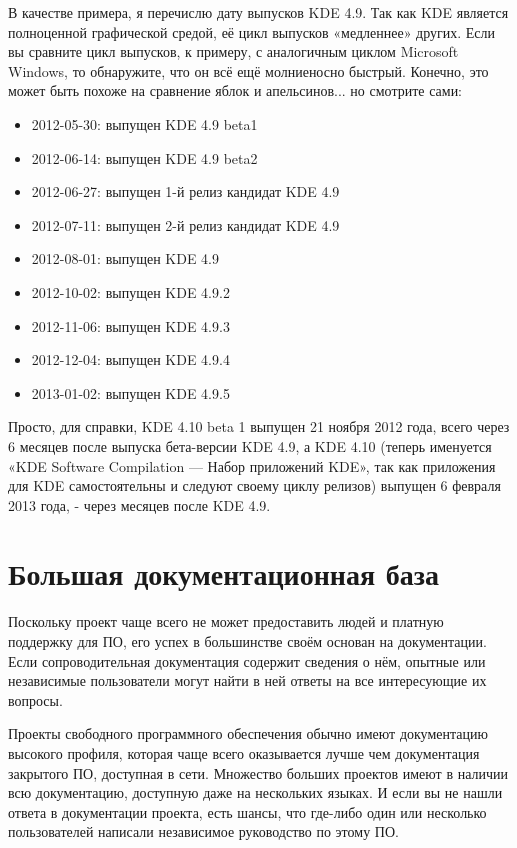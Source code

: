 \documentclass[12pt]{book}
\begin{document}
В качестве примера, я перечислю дату выпусков KDE 4.9. Так как KDE является полноценной графической средой, её цикл выпусков «медленнее» других. Если вы сравните цикл выпусков, к примеру, с аналогичным циклом Microsoft Windows, то обнаружите, что он всё ещё молниеносно быстрый.  Конечно, это может быть похоже на сравнение яблок и апельсинов... но смотрите сами:
\begin{itemize}
	\item 2012-05-30: выпущен KDE 4.9 beta1
	\item 2012-06-14: выпущен KDE 4.9 beta2
	\item 2012-06-27: выпущен 1-й релиз кандидат KDE 4.9 
	\item 2012-07-11: выпущен 2-й релиз кандидат KDE 4.9
	\item 2012-08-01: выпущен KDE 4.9 
	\item 2012-10-02: выпущен KDE 4.9.2
	\item 2012-11-06: выпущен KDE 4.9.3
	\item 2012-12-04: выпущен KDE 4.9.4
	\item 2013-01-02: выпущен KDE 4.9.5
\end{itemize}

Просто, для справки, KDE 4.10 beta 1 выпущен 21 ноября 2012 года, всего через 6 месяцев после выпуска бета-версии KDE 4.9, а KDE 4.10 (теперь именуется «KDE Software Compilation — Набор приложений KDE», так как приложения для KDE самостоятельны и следуют своему циклу релизов) выпущен 6 февраля 2013 года, - через  месяцев после KDE 4.9.

\section{Большая документационная база}

Поскольку проект чаще всего не может предоставить людей и платную поддержку для ПО, его успех в большинстве своём основан на документации. Если сопроводительная документация содержит сведения о нём, опытные или независимые пользователи могут найти в ней ответы на все интересующие их вопросы.

Проекты свободного программного обеспечения обычно имеют документацию высокого профиля, которая чаще всего оказывается лучше чем документация закрытого ПО, доступная в сети. Множество больших проектов имеют в наличии всю документацию, доступную  даже на нескольких языках. И если вы не нашли ответа в документации проекта, есть шансы, что где-либо один или несколько пользователей написали независимое руководство по этому ПО.
\end{document}
